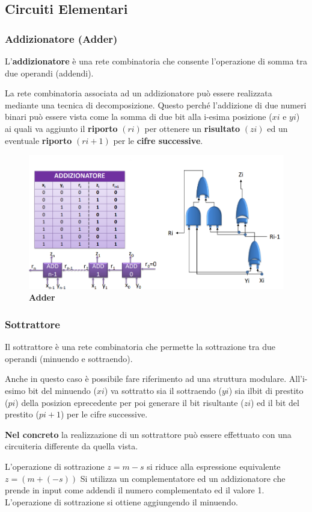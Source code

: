 \documentclass[12pt]{article}
\begin{document}
\newpage
\subsection{Circuiti Elementari}
\subsubsection{Addizionatore (Adder)}
L’\textbf{addizionatore} è una rete combinatoria che consente l’operazione di somma tra due
operandi (addendi). \par\medskip\noindent
La rete combinatoria associata ad un addizionatore può essere realizzata mediante una tecnica di decomposizione. Questo perché l’addizione di due numeri binari può essere vista come la somma di due bit alla i-esima posizione (\(xi\) e \( yi\)) ai quali va aggiunto il \textbf{riporto} \((ri)\) per ottenere un \textbf{risultato} \((zi)\) ed un eventuale \textbf{riporto} \((ri+1)\) per le\textbf{ cifre successive}.
\begin{figure}[h]
    \centering
    \includegraphics[width=0.75\linewidth]{Addizionatore.png}
    \caption{\textbf{Adder}}
    \label{fig:enter-label}
\end{figure}

\subsubsection{Sottrattore}
Il sottrattore è una rete combinatoria che permette la sottrazione tra due operandi (minuendo e sottraendo).\par\medskip\noindent
Anche in questo caso è possibile fare riferimento ad una struttura modulare.
All’i-esimo bit del minuendo (\(xi\)) va sottratto sia il sottraendo (\(yi\)) sia ilbit di prestito (\(pi\)) della posizion eprecedente per poi generare il bit risultante (\(zi\)) ed il bit del prestito (\(pi+1\)) per le cifre successive.\par\medskip\noindent
\textbf{Nel concreto} la realizzazione di un sottrattore può essere effettuato con una circuiteria differente da quella vista. \par\medskip\noindent
L’operazione di sottrazione \(z=m-s\) si riduce alla espressione equivalente \(z=(m+(-s))\)
Si utilizza un complementatore ed un addizionatore che prende in input come addendi il numero complementato ed il valore 1. L’operazione di sottrazione si ottiene aggiungendo il minuendo.
\end{document}

